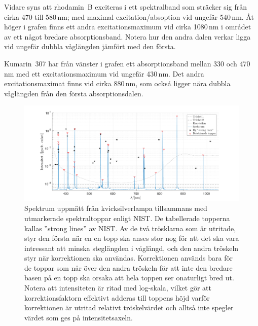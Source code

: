 \documentclass[11pt,a4paper]{article}
\begin{document}
Vidare syns att rhodamin~B exciteras i ett spektralband som
sträcker sig från cirka 470 till 580\,nm; med maximal
excitation/absoption vid ungefär 540\,nm. Åt höger i grafen finns ett
andra excitationsmaximum vid cirka 1080\,nm i området av ett något
bredare absorptionsband. Notera hur den andra dalen verkar ligga vid
ungefär dubbla våglängden jämfört med den första. 

Kumarin~307 har från vänster i grafen ett absorptionsband
mellan 330 och 470\,nm med ett excitationsmaximum vid ungefär 430\,nm. Det
andra excitationsmaximat finns vid cirka 880\,nm, som också ligger
nära dubbla våglängden från den första absorptionsdalen. 


\begin{figure}
\centering
\centerline{ %
\includegraphics[width=1.2\textwidth]{Hg_spektrum.pdf}
}
\caption{Spektrum uppmätt från kvicksilverlampa tillsammans med
  utmarkerade spektraltoppar enligt NIST\cite{NIST_spectrum}. 
  De tabellerade topperna kallas ''strong lines'' av NIST.
  Av de två trösklarna som är utritade, styr den första när en en topp
  ska anses stor nog för att det ska vara intressant att minska
  steglängden i våglängd, och den andra tröskeln styr när korrektionen
  ska användas. Korrektionen används bara för de toppar som når över
  den andra tröskeln för att inte den bredare basen på en topp ska
  orsaka att hela toppen ser onaturligt bred ut. Notera att intensiteten
  är ritad med log-skala, vilket gör att korrektionsfaktorn effektivt
  adderas till toppens höjd varför korrektionen är utritad relativt
  tröskelvärdet och alltså inte spegler värdet som ges på
  intensitetsaxeln. 
}
\label{fig:Hg_spektrum}
\end{figure}
\end{document}

